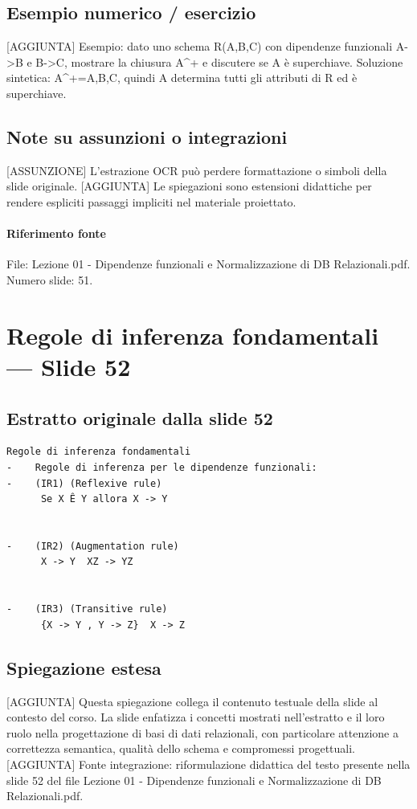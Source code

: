 \documentclass[11pt]{article}
\begin{document}
\subsection*{Esempio numerico / esercizio}
[AGGIUNTA] Esempio: dato uno schema R(A,B,C) con dipendenze funzionali A->B e B->C, mostrare la chiusura A^+ e discutere se A è superchiave. Soluzione sintetica: A^+={A,B,C}, quindi A determina tutti gli attributi di R ed è superchiave.
\subsection*{Note su assunzioni o integrazioni}
[ASSUNZIONE] L'estrazione OCR può perdere formattazione o simboli della slide originale.
[AGGIUNTA] Le spiegazioni sono estensioni didattiche per rendere espliciti passaggi impliciti nel materiale proiettato.
\paragraph{Riferimento fonte} File: Lezione 01 - Dipendenze funzionali e Normalizzazione di DB Relazionali.pdf. Numero slide: 51.
\section{Regole di inferenza fondamentali --- Slide 52}
\subsection*{Estratto originale dalla slide 52}
\begin{lstlisting}
Regole di inferenza fondamentali
-    Regole di inferenza per le dipendenze funzionali:
-    (IR1) (Reflexive rule)
      Se X Ê Y allora X -> Y


-    (IR2) (Augmentation rule)
      X -> Y  XZ -> YZ


-    (IR3) (Transitive rule)
      {X -> Y , Y -> Z}  X -> Z
\end{lstlisting}
\subsection*{Spiegazione estesa}
[AGGIUNTA] Questa spiegazione collega il contenuto testuale della slide al contesto del corso. La slide enfatizza i concetti mostrati nell'estratto e il loro ruolo nella progettazione di basi di dati relazionali, con particolare attenzione a correttezza semantica, qualità dello schema e compromessi progettuali.
[AGGIUNTA] Fonte integrazione: riformulazione didattica del testo presente nella slide 52 del file Lezione 01 - Dipendenze funzionali e Normalizzazione di DB Relazionali.pdf.
\end{document}
